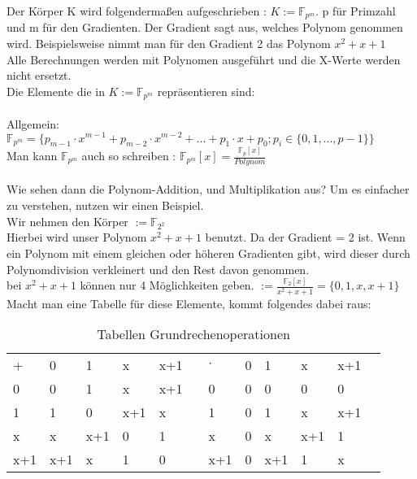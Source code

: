 Der Körper K wird folgendermaßen aufgeschrieben : $ K := \mathbb{F}_{p^m}$. p für Primzahl und m für den Gradienten. Der Gradient sagt aus, welches Polynom genommen wird. 
Beispielsweise nimmt man für den Gradient 2 das Polynom $x^2 + x + 1$\\
Alle Berechnungen werden mit Polynomen ausgeführt und die X-Werte werden nicht ersetzt.
\\
Die Elemente die in $ K := \mathbb{F}_{p^m}$ repräsentieren sind:\\
\\
Allgemein: $  \mathbb{F}_{p^m} = \{p_{m-1} \cdot x^{m-1} + p_{m-2} \cdot x^{m-2} + ... + p_1 \cdot x + p_0 ; p_i \in \{0,1,..., p-1\} \}$\\
Man kann $\mathbb{F}_{p^m}$ auch so schreiben : $\mathbb{F}_{p^m}[x] = \frac{\mathbb{F}_{p}[x]}{Polynom} $\\
\\
Wie sehen dann die Polynom-Addition, und Multiplikation aus? Um es einfacher zu verstehen, nutzen wir einen Beispiel.
\\
Wir nehmen den Körper $ := \mathbb{F}_{2^2}$
\\
Hierbei wird unser Polynom $ x^2+ x + 1 $ benutzt. Da der Gradient = 2 ist. Wenn ein Polynom mit einem gleichen oder höheren Gradienten gibt, wird dieser durch Polynomdivision verkleinert und den Rest davon genommen.\\
bei $ x^2+ x + 1 $ können nur 4 Möglichkeiten geben. $ := \frac{\mathbb{F}_{2}[x]}{x^2+ x + 1} = \{0, 1, x, x+1\}$\\

Macht man eine Tabelle für diese Elemente, kommt folgendes dabei raus:

\begin{table}[h]\caption{Tabellen Grundrechenoperationen}
    \begin{tabular}{l|l|l|l|lll|l|l|l|ll}
    +   & 0   & 1   & x   & x+1 &  & $\cdot$   & 0 & 1   & x   & x+1 &  \\ \cline{1-5} \cline{7-11}
    0   & 0   & 1   & x   & x+1 &  & 0   & 0 & 0   & 0   & 0   &  \\ \cline{1-5} \cline{7-11}
    1   & 1   & 0   & x+1 & x   &  & 1   & 0 & 1   & x   & x+1 &  \\ \cline{1-5} \cline{7-11}
    x   & x   & x+1 & 0   & 1   &  & x   & 0 & x   & x+1 & 1   &  \\ \cline{1-5} \cline{7-11}
    x+1 & x+1 & x   & 1   & 0   &  & x+1 & 0 & x+1 & 1   & x   & 
    \end{tabular}
\end{table}

